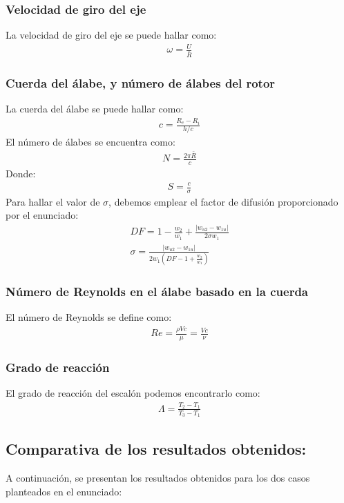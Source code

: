 \documentclass{report}
\begin{document}
\subsubsection{Velocidad de giro del eje}
La velocidad de giro del eje se puede hallar como:
\begin{gather}
\omega = \frac{U}{\bar{R}}
\end{gather}
\subsubsection{Cuerda del álabe, y número de álabes del rotor}
La cuerda del álabe se puede hallar como:
\begin{gather}
c = \frac{R_e-R_i}{h/c}
\end{gather}
El número de álabes se encuentra como:
\begin{gather}
N = \frac{2 \pi \bar{R}}{c}
\end{gather}
Donde:
\begin{gather}
S = \frac{c}{\sigma}
\end{gather}
Para hallar el valor de $\sigma$, debemos emplear el factor de difusión proporcionado por el enunciado:
\begin{gather}
DF = 1 - \frac{w_2}{w_1} + \frac{|w_{u2}-w_{1u}|}{2 \sigma w_1}\\
\sigma = \frac{|w_{u2}-w_{1u}|}{2 w_1 (DF - 1 + \frac{w_2}{w_1})}
\end{gather}
\subsubsection{Número de Reynolds en el álabe basado en la cuerda}
El número de Reynolds se define como:
\begin{gather}
Re = \frac{\rho V c}{\mu} = \frac{V c}{\nu}
\end{gather}
\subsubsection{Grado de reacción}
El grado de reacción del escalón podemos encontrarlo como:
\begin{gather}
\Lambda = \frac{T_2-T_1}{T_3-T_1}
\end{gather}
\subsection{Comparativa de los resultados obtenidos:}
A continuación, se presentan los resultados obtenidos para los dos casos planteados en el enunciado:
\end{document}

